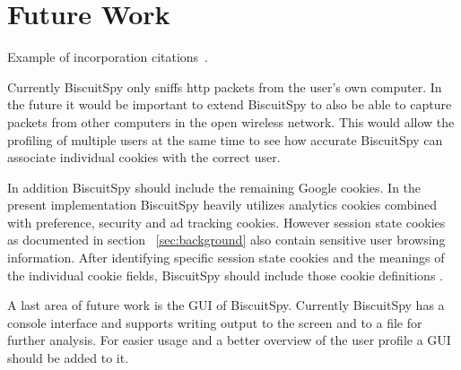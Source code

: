 \section{Future Work}
\label{sec:future}

Example of incorporation citations~\cite{coral:nsdi04}.

Currently BiscuitSpy only sniffs http packets from the user's own computer. In the future it would be important to extend BiscuitSpy to also be able to capture packets from other computers in the open wireless network. This would allow the profiling of multiple users at the same time to see how accurate BiscuitSpy can associate individual cookies with the correct user.

In addition BiscuitSpy should include the remaining Google cookies. In the present implementation BiscuitSpy heavily utilizes analytics cookies combined with preference, security and ad tracking cookies. However session state cookies as documented in section ~\ref{sec:background} also contain sensitive user browsing information. After identifying specific session state cookies and the meanings of the individual cookie fields, BiscuitSpy should include those cookie definitions .

A last area of future work is the GUI of BiscuitSpy. Currently BiscuitSpy has a console interface and supports writing output to the screen and to a file for further analysis. For easier usage and a better overview of the user profile a GUI should be added to it.